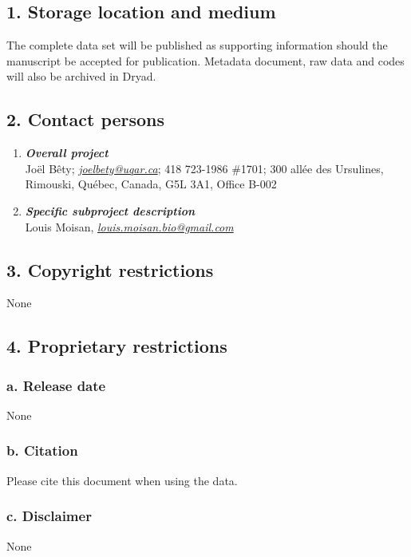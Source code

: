 \documentclass[a4paper,twoside,12pt]{article}
\begin{document}
                \subsection*{1. Storage location and medium}
The complete data set will be published as supporting information should the manuscript be accepted for publication. Metadata document, raw data and codes will also be archived in Dryad.
                 
        \subsection*{2. Contact persons}
        \begin{enumerate}[label=\alph*.]
                        \item[] \textit{\textbf{Overall project}}\\
                        Joël Bêty; \textit{\href{mailto:joel_bety@uqar.ca}{joel{\textunderscore}bety@uqar.ca}}; 418 723-1986 \#1701; 300 allée des Ursulines, Rimouski, Québec, Canada, G5L 3A1, Office B-002
                        \item[] \textit{\textbf{Specific subproject description}}\\
                         Louis Moisan, \textit{\href{mailto:louis.moisan.bio@gmail.com}{louis.moisan.bio@gmail.com}}
                \end{enumerate}
                \subsection*{3. Copyright restrictions}
                None
                 
                \subsection*{4. Proprietary restrictions}
                        \subsubsection*{a. Release date} None
                        \subsubsection*{b. Citation}
                         Please cite this document when using the data.
                        \subsubsection*{c. Disclaimer} None
                        
\end{document}
